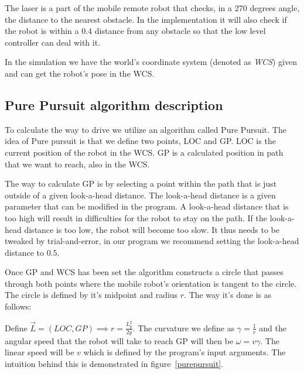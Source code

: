 \documentclass[12pt]{article}
\begin{document}
The laser is a part of the mobile remote robot that checks, in a 270 degrees angle,
the distance to the nearest obstacle. In the implementation it will also check
if the robot is within a $0.4$ distance from any obstacle so that the low level
controller can deal with it.

In the simulation we have the world's coordinate system (denoted as
\textit{WCS}) given and can get the robot's pose in the WCS. 

\subsection{Pure Pursuit algorithm description}

To calculate the way to drive we utilize an algorithm called Pure Pursuit. The
idea of Pure pursuit is that we define two points, LOC and GP. LOC is the
current position of the robot in the WCS. GP is a calculated position in path
that we want to reach, also in the WCS. 

The way to calculate GP is by selecting a point within the path that is
just outside of a given look-a-head distance. The look-a-head distance is a
given parameter that can be modified in the program. A look-a-head
distance that is too high will result in difficulties for the robot to stay on the path.
If the look-a-head distance is too low, the robot will become too slow. It thus needs
to be tweaked by trial-and-error, in our program we recommend setting the look-a-head
distance to $0.5$.

Once GP and WCS has been set the algorithm constructs a circle that passes
through both points where the mobile robot's orientation is tangent to the
circle. The circle is defined by it's midpoint and radius $r$. The way it's done is
as follows:

Define $\vec{L} = (LOC, GP) \implies r = \frac{L_{y}^2}{2y}$. The curvature we
define as $\gamma = \frac{1}{r}$ and the angular speed that the robot will
take to reach GP will then be $\omega = v\gamma$. The linear speed will 
be $v$ which is defined by the program's input arguments. The intuition behind
this is demonstrated in figure~\ref{purepursuit}.







\end{document}
